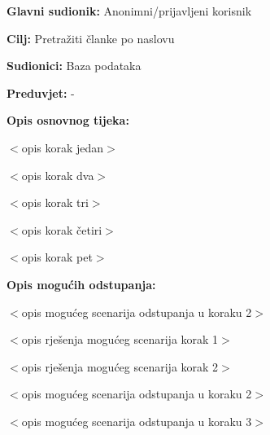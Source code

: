 \noindent {}
\begin{packed_item}

\item \textbf{Glavni sudionik:} Anonimni/prijavljeni korisnik
\item  \textbf{Cilj:} Pretražiti članke po naslovu
\item  \textbf{Sudionici:} Baza podataka
\item  \textbf{Preduvjet:} -
\item  \textbf{Opis osnovnog tijeka:}

\item[] \begin{packed_enum}

    \item $<$opis korak jedan$>$
    \item $<$opis korak dva$>$
    \item $<$opis korak tri$>$
    \item $<$opis korak četiri$>$
    \item $<$opis korak pet$>$

\end{packed_enum}

\item  \textbf{Opis mogućih odstupanja:}

\item[] \begin{packed_item}

    \item[2.a] $<$opis mogućeg scenarija odstupanja u koraku 2$>$

    \item[] \begin{packed_enum}

        \item $<$opis rješenja mogućeg scenarija korak 1$>$
        \item $<$opis rješenja mogućeg scenarija korak 2$>$

    \end{packed_enum}

\item[2.b] $<$opis mogućeg scenarija odstupanja u koraku 2$>$
\item[3.a] $<$opis mogućeg scenarija odstupanja  u koraku 3$>$

\end{packed_item}

\end{packed_item}

